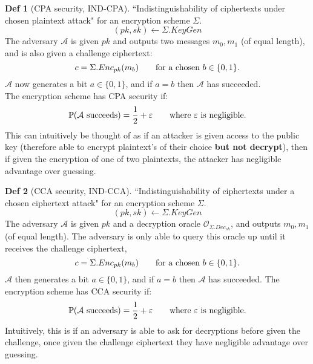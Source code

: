 \documentclass[a4paper, 10pt]{article}
\theoremstyle{definition}
\newtheorem{definition}{Def}[section]
\begin{document}
\begin{definition}[\ac{CPA} security, \ac{IND}-\ac{CPA}]
    ``Indistinguishability of ciphertexts under chosen plaintext attack" for an encryption scheme $\Sigma $.\\
    \[(pk, sk) \leftarrow \Sigma.KeyGen \]
    The adversary $\mathcal{A} $ is given $pk$ and outputs two messages $m_0, m_1$ (of equal length), and is also given a challenge ciphertext:
    \[c=\Sigma .Enc_{pk}(m_b)\text{\qquad for a chosen }b \in \{ 0,1\}.\] 
    $\mathcal{A}$ now generates a bit $a \in \{ 0,1\}$, and if $a=b$ then $\mathcal{A}$ has succeeded.\\
    The encryption scheme has \ac{CPA} security if:
    \[\mathbb{P} (\mathcal{A} \text{ succeeds}) = \frac{1}{2} + \varepsilon\text{\qquad where $\varepsilon$ is negligible.}\]
    This can intuitively be thought of as if an attacker is given access to the public key (therefore able to encrypt plaintext's of their choice \textbf{but not decrypt}), then if given the encryption of one of two plaintexts, the attacker has negligible advantage over guessing.
\end{definition}
\begin{definition}[\ac{CCA} security, \ac{IND}-\ac{CCA}]
    ``Indistinguishability of ciphertexts under a chosen ciphertext attack" for an encryption scheme $\Sigma $.\\
    \[(pk, sk) \leftarrow \Sigma.KeyGen \]
    The adversary $\mathcal{A} $ is given $pk$ and a decryption oracle $\mathcal{O}_{\Sigma .Dec_{sk}}$, and outputs $m_0, m_1$ (of equal length). The adversary is only able to query this oracle up until it receives the challenge ciphertext,
    \[c=\Sigma .Enc_{pk}(m_b)\text{\qquad for a chosen }b \in \{ 0,1\}.\] 
    $\mathcal{A} $ then generates a bit $a \in \{ 0, 1\}$, and if $a=b$ then $\mathcal{A} $ has succeeded.
    The encryption scheme has \ac{CCA} security if:
    \[\mathbb{P} (\mathcal{A} \text{ succeeds}) = \frac{1}{2} + \varepsilon \text{\qquad where $\varepsilon$ is negligible.}\]
    Intuitively, this is if an adversary is able to ask for decryptions before given the challenge, once given the challenge ciphertext they have negligible advantage over guessing.
\end{definition}
\end{document}
